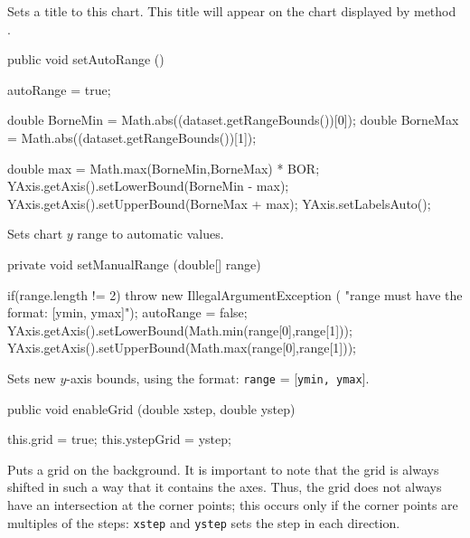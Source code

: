 \begin{tabb}
   Sets a title to this chart. This title will appear on the chart displayed
 by method .
\end{tabb}
\begin{htmlonly}
\end{htmlonly}
\begin{code}

   public void setAutoRange () \begin{hide} {
      autoRange = true;

      double BorneMin = Math.abs((dataset.getRangeBounds())[0]);
      double BorneMax = Math.abs((dataset.getRangeBounds())[1]);

      double max = Math.max(BorneMin,BorneMax) * BOR;
      YAxis.getAxis().setLowerBound(BorneMin - max);
      YAxis.getAxis().setUpperBound(BorneMax + max);
      YAxis.setLabelsAuto();
   }\end{hide}
\end{code}
\begin{tabb}
   Sets chart $y$ range to automatic values.
\end{tabb}
\begin{code}

   private void setManualRange (double[] range) \begin{hide}  {
      if(range.length != 2)
         throw new IllegalArgumentException (
             "range must have the format: [ymin, ymax]");
      autoRange = false;
      YAxis.getAxis().setLowerBound(Math.min(range[0],range[1]));
      YAxis.getAxis().setUpperBound(Math.max(range[0],range[1]));
   }\end{hide}
\end{code}
\begin{tabb}
   Sets new $y$-axis bounds, using the format:
\texttt{range} = [\texttt{ymin, ymax}].
\end{tabb}
\begin{htmlonly}
\end{htmlonly}
\begin{code}

   public void enableGrid (double xstep, double ystep) \begin{hide} {
      this.grid = true;
      this.ystepGrid = ystep;
   }\end{hide}
\end{code}
\begin{tabb}
   Puts a grid on the background. It is important to note that the grid is
   always shifted in such a way that it contains the axes. Thus, the grid does
   not always have an intersection at the corner points; this occurs
   only if the corner points are multiples of the steps: \texttt{xstep}
   and \texttt{ystep} sets the step in each direction.
\end{tabb}
